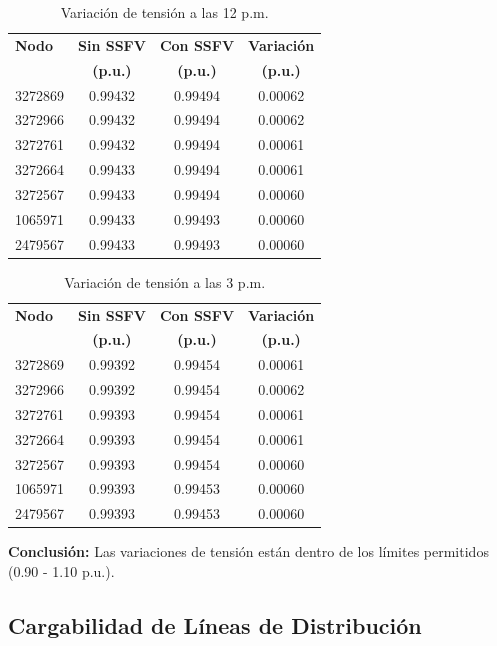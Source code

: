 \begin{table}[H]
    \centering
    \caption{Variación de tensión a las 12 p.m.}
    \begin{tabular}{lccc}
    \toprule
    \textbf{Nodo} & \textbf{Sin SSFV} & \textbf{Con SSFV} & \textbf{Variación} \\
    \textbf{} & \textbf{(p.u.)} & \textbf{(p.u.)} & \textbf{(p.u.)} \\
    \midrule
    3272869 & 0.99432 & 0.99494 & 0.00062 \\
    3272966 & 0.99432 & 0.99494 & 0.00062 \\
    3272761 & 0.99432 & 0.99494 & 0.00061 \\
    3272664 & 0.99433 & 0.99494 & 0.00061 \\
    3272567 & 0.99433 & 0.99494 & 0.00060 \\
    1065971 & 0.99433 & 0.99493 & 0.00060 \\
    2479567 & 0.99433 & 0.99493 & 0.00060 \\
    \bottomrule
    \end{tabular}
\end{table}

\begin{table}[H]
    \centering
    \caption{Variación de tensión a las 3 p.m.}
    \begin{tabular}{lccc}
    \toprule
    \textbf{Nodo} & \textbf{Sin SSFV} & \textbf{Con SSFV} & \textbf{Variación} \\
    \textbf{} & \textbf{(p.u.)} & \textbf{(p.u.)} & \textbf{(p.u.)} \\
    \midrule
    3272869 & 0.99392 & 0.99454 & 0.00061 \\
    3272966 & 0.99392 & 0.99454 & 0.00062 \\
    3272761 & 0.99393 & 0.99454 & 0.00061 \\
    3272664 & 0.99393 & 0.99454 & 0.00061 \\
    3272567 & 0.99393 & 0.99454 & 0.00060 \\
    1065971 & 0.99393 & 0.99453 & 0.00060 \\
    2479567 & 0.99393 & 0.99453 & 0.00060 \\
    \bottomrule
    \end{tabular}
\end{table}

\textbf{Conclusión:} Las variaciones de tensión están dentro de los límites permitidos (0.90 - 1.10 p.u.).

\subsection{Cargabilidad de Líneas de Distribución}

